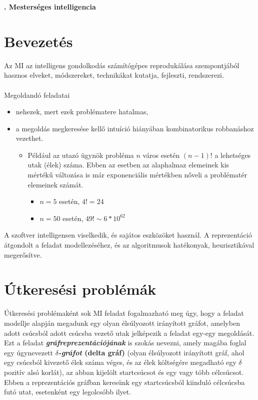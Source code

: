 \documentclass[12pt,margin=0px]{article}
\date{}
\begin{document}
    \begin{center}
        {\Large\bfseries{}. Mesterséges intelligencia} \\
    \end{center}

	\section*{Bevezetés}
	
	\noindent Az MI az intelligens gondolkodás számítógépes reprodukálása szempontjából hasznos elveket, módszereket, technikákat kutatja, fejleszti, rendszerezi.\\\\
    Megoldandó feladatai
    \begin{itemize}
        \item nehezek, mert ezek problématere hatalmas,
        \item a megoldás megkeresése kellő intuíció hiányában kombinatorikus robbanáshoz vezethet.
        \begin{itemize}
            \small \color{mygray}
            \item Például az utazó ügynök probléma $n$ város esetén $(n-1)!$ a lehetséges utak (élek) száma. Ebben az esetben az alaphalmaz elemeinek kis mértékű változása is már exponenciális mértékben nőveli a problématér elemeinek számát.
            \begin{itemize}
                \item $n = 5$ esetén, $4! = 24$
                \item $n = 50$ esetén, $49! \sim 6 * 10^{62}$
            \end{itemize}
        \end{itemize}
    \end{itemize}
    A szoftver intelligensen viselkedik, és sajátos eszközöket használ. A reprezentáció átgondolt a feladat modellezéséhez, és az algoritmusok hatékonyak, heurisztikával megerősítve.
	
	\section*{Útkeresési problémák}

    \noindent Útkeresési problémaként sok MI feladat fogalmazható meg úgy, hogy a feladat modellje alapján megadunk egy olyan élsúlyozott irányított gráfot, amelyben adott csúcsból adott csúcsba vezető utak jelképezik a feladat egy-egy megoldását. Ezt a feladat \textbf{\textit{gráfreprezentációjának}} is szokás nevezni, amely magába foglal egy úgynevezett \textbf{\textit{$\delta$-gráfot} (delta gráf)} (olyan élsúlyozott irányított gráf, ahol egy csúcsból kivezető élek száma véges, és az élek költségére megadható egy $\delta$ pozitív alsó korlát), az abban kijelölt startcsúcsot és egy vagy több célcsúcsot. Ebben a reprezentációs gráfban keresünk egy startcsúcsból kiinduló célcsúcsba futó utat, esetenként egy legolcsóbb ilyet.\\
\end{document}
